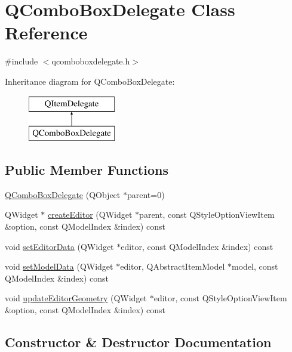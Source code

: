 \hypertarget{class_q_combo_box_delegate}{}\section{Q\+Combo\+Box\+Delegate Class Reference}
\label{class_q_combo_box_delegate}


{\ttfamily \#include $<$qcomboboxdelegate.\+h$>$}

Inheritance diagram for Q\+Combo\+Box\+Delegate\+:\begin{figure}[H]
\begin{center}
\leavevmode
\includegraphics[height=2.000000cm]{class_q_combo_box_delegate}
\end{center}
\end{figure}
\subsection*{Public Member Functions}
\begin{DoxyCompactItemize}
\item 
\hyperlink{class_q_combo_box_delegate_a5894396d9b9694ad60516be6457b9e97}{Q\+Combo\+Box\+Delegate} (Q\+Object $\ast$parent=0)
\item 
Q\+Widget $\ast$ \hyperlink{class_q_combo_box_delegate_a2cae1e908e3b9864e7ab174cfa39a9a8}{create\+Editor} (Q\+Widget $\ast$parent, const Q\+Style\+Option\+View\+Item \&option, const Q\+Model\+Index \&index) const 
\item 
void \hyperlink{class_q_combo_box_delegate_abf09d46bd215e169c921a282a1052cf2}{set\+Editor\+Data} (Q\+Widget $\ast$editor, const Q\+Model\+Index \&index) const 
\item 
void \hyperlink{class_q_combo_box_delegate_a17c8842bbf2a85035143fd3d104f802a}{set\+Model\+Data} (Q\+Widget $\ast$editor, Q\+Abstract\+Item\+Model $\ast$model, const Q\+Model\+Index \&index) const 
\item 
void \hyperlink{class_q_combo_box_delegate_a606e97162b64134d8d3189bea7cdd11a}{update\+Editor\+Geometry} (Q\+Widget $\ast$editor, const Q\+Style\+Option\+View\+Item \&option, const Q\+Model\+Index \&index) const 
\end{DoxyCompactItemize}


\subsection{Constructor \& Destructor Documentation}
\hypertarget{class_q_combo_box_delegate_a5894396d9b9694ad60516be6457b9e97}{}
